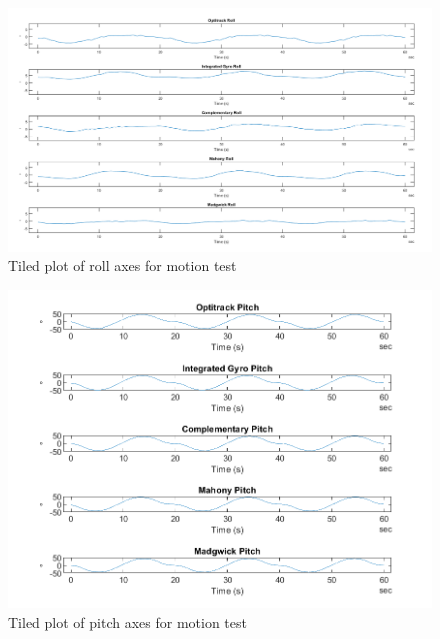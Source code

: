 \begin{figure}[H]
    \centering
    \includegraphics[scale=0.5]{graphics/Navigation/TiledMotionRoll.png}
    \caption{Tiled plot of roll axes for motion test}
     \label{fig:Tiled plot of filters roll axes for motion test}
\end{figure}

\begin{figure}[H]
    \centering
    \includegraphics[scale=1]{graphics/Navigation/TiledMotionPitch.png}
    \caption{Tiled plot of pitch axes for motion test}
     \label{fig:Tiled plot of filters pitch axes for motion test}
\end{figure}

